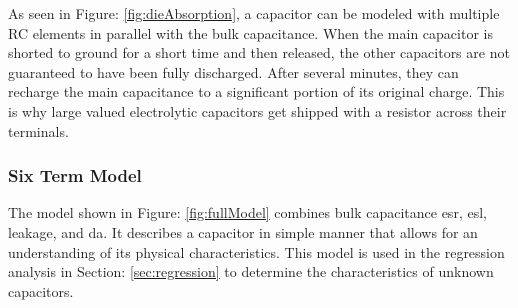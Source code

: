 As seen in Figure: \ref{fig:dieAbsorption}, a capacitor can be modeled with multiple RC elements in parallel with the bulk capacitance. When the main capacitor is shorted to ground for a short time and then released, the other capacitors are not guaranteed to have been fully discharged. After several minutes, they can recharge the main capacitance to a significant portion of its original charge. This is why large valued electrolytic capacitors get shipped with a resistor across their terminals.

\subsubsection{Six Term Model}


The model shown in Figure: \ref{fig:fullModel} combines bulk capacitance \gls{esr}, \gls{esl}, leakage, and \gls{da}. It describes a capacitor in simple manner that allows for an understanding of its physical characteristics. This model is used in the regression analysis in Section: \ref{sec:regression} to determine the characteristics of unknown capacitors.


